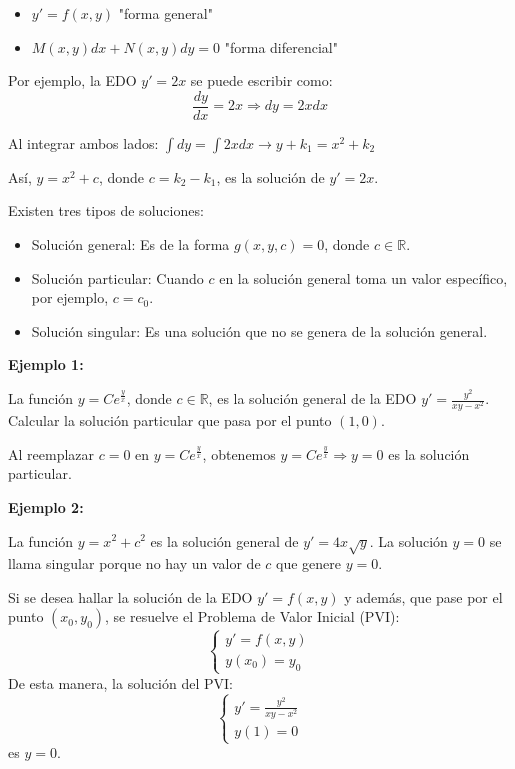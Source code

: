 \documentclass[12pt,letterpaper]{article}
\begin{document}
\begin{itemize}
\item $y' = f(x,y)$ "forma general"
\item $M(x,y) dx + N(x, y)dy = 0$ "forma diferencial"
\end{itemize}

Por ejemplo, la EDO $y' = 2x$ se puede escribir como:
\[\frac{dy}{dx} = 2x \Rightarrow dy = 2x dx\]

Al integrar ambos lados: $\int dy = \int 2x dx \rightarrow y + k_1 = x^2 + k_2$

Así, $y = x^2 + c$, donde $c = k_2 - k_1$, es la solución de $y' = 2x$.


Existen tres tipos de soluciones:

\begin{itemize}
\item Solución general: Es de la forma $g(x, y, c) = 0$, donde $c \in \mathbb{R}$.
\item Solución particular: Cuando $c$ en la solución general toma un valor específico, por ejemplo, $c = c_0$.
\item Solución singular: Es una solución que no se genera de la solución general.

\end{itemize}

\textbf{Ejemplo 1:}

La función $y = C e^{\frac{y}{x}}$, donde $c \in \mathbb{R}$, es la solución general de la EDO $y' = \frac{y^2}{xy - x^2}$. Calcular la solución particular que pasa por el punto $(1,0)$.

Al reemplazar $c = 0$ en $y = C e^{\frac{y}{x}}$, obtenemos $y = C e^{\frac{y}{x}} \Rightarrow y = 0$ es la solución particular.

\textbf{Ejemplo 2:}

La función $y = x^2 + c^2$ es la solución general de $y' = 4x\sqrt{y}$. La solución $y = 0$ se llama singular porque no hay un valor de $c$ que genere $y = 0$.

Si se desea hallar la solución de la EDO $y' = f(x,y)$ y además, que pase por el punto $(x_0, y_0)$, se resuelve el Problema de Valor Inicial (PVI):
\[
\begin{cases}
y' = f(x, y) \\
y(x_0) = y_0
\end{cases}
\]
De esta manera, la solución del PVI:
\[
\begin{cases}
y' = \frac{y^2}{xy - x^2} \\
y(1) = 0
\end{cases}
\]
es $y = 0$.
\end{document}
